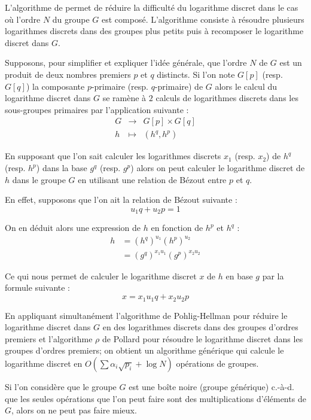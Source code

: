 \documentclass[a4paper]{article}
\theoremstyle{definition}
\theoremstyle{remark}
\numberwithin{equation}{section}
\begin{document}
L'algorithme de \citet{pohlig-hellman} permet de réduire la difficulté du logarithme discret dans le cas où l'ordre $N$ du groupe $G$ est composé. L'algorithme consiste à résoudre plusieurs logarithmes discrets dans des groupes plus petits puis à recomposer le logarithme discret dans $G$.

Supposons, pour simplifier et expliquer l'idée générale, que l'ordre $N$ de $G$ est un produit de deux nombres premiers $p$ et $q$ distincts. Si l'on note $G[p]$ (resp. $G[q]$) la composante $p$-primaire (resp. $q$-primaire) de $G$ alors le calcul du logarithme discret dans $G$ se ramène à $2$ calculs de logarithmes discrets dans les sous-groupes primaires par l'application suivante :
\begin{equation*}
\begin{array}{lcl}
G & \longrightarrow & G[p] \times G[q] \\
h & \longmapsto & (h^q, h^p)
\end{array}
\end{equation*}

En supposant que l'on sait calculer les logarithmes discrets $x_1$ (resp. $x_2$) de $h^q$ (resp. $h^p$) dans la base $g^q$ (resp. $g^p$) alors on peut calculer le logarithme discret de $h$ dans le groupe $G$ en utilisant une relation de Bézout entre $p$ et $q$. 

En effet, supposons que l'on ait la relation de Bézout suivante :
$$u_1 q + u_2 p = 1$$

On en déduit alors une expression de $h$ en fonction de $h^p$ et $h^q$ :
\begin{align*}
h &= (h^q)^{u_1}(h^p)^{u_2} \\
  &= (g^q)^{x_1u_1}(g^p)^{x_2u_2}
\end{align*}

Ce qui nous permet de calculer le logarithme discret $x$ de $h$ en base $g$ par la formule suivante :
$$x = x_1 u_1 q + x_2 u_2 p$$

En appliquant simultanément l'algorithme de Pohlig-Hellman pour réduire le logarithme discret dans $G$ en des logarithmes discrets dans des groupes d'ordres premiers et l'algorithme $\rho$ de Pollard pour résoudre le logarithme discret dans les groupes d'ordres premiers; on obtient un algorithme générique qui calcule le logarithme discret en $O(\sum{\alpha_i\sqrt{p_i}}+\log N)$ opérations de groupes.

Si l'on considère que le groupe $G$ est une boîte noire (groupe générique) c.-à-d. que les seules opérations que l'on peut faire sont des multiplications d'éléments de $G$, alors on ne peut pas faire mieux.
\end{document}
